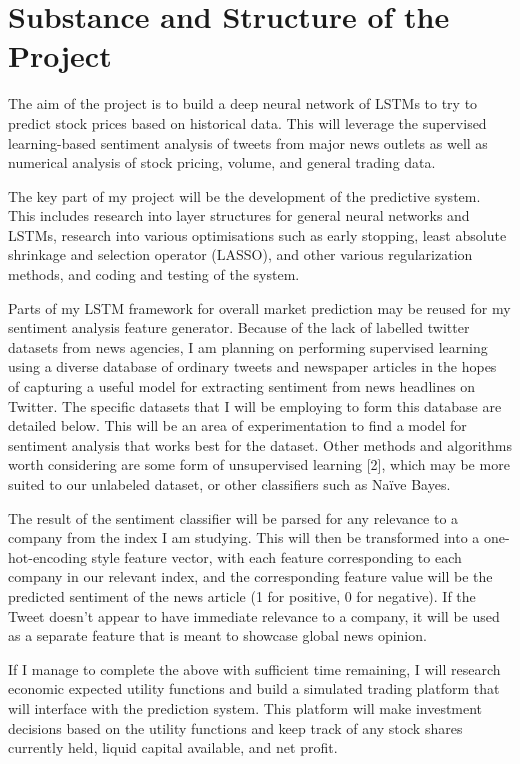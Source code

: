 \documentclass[12pt,a4paper,twoside,openright]{report}
\begin{document}
\section*{Substance and Structure of the Project}

The aim of the project is to build a deep neural network of LSTMs to try to predict stock prices
based on historical data. This will leverage the supervised learning-based sentiment analysis of
tweets from major news outlets as well as numerical analysis of stock pricing, volume, and
general trading data.

The key part of my project will be the development of the predictive system. This includes
research into layer structures for general neural networks and LSTMs, research into various
optimisations such as early stopping, least absolute shrinkage and selection operator (LASSO),
and other various regularization methods, and coding and testing of the system.

Parts of my LSTM framework for overall market prediction may be reused for my sentiment
analysis feature generator. Because of the lack of labelled twitter datasets from news agencies, I
am planning on performing supervised learning using a diverse database of ordinary tweets and
newspaper articles in the hopes of capturing a useful model for extracting sentiment from news
headlines on Twitter. The specific datasets that I will be employing to form this database are
detailed below. This will be an area of experimentation to find a model for sentiment analysis
that works best for the dataset. Other methods and algorithms worth considering are some form
of unsupervised learning [2], which may be more suited to our unlabeled dataset, or other
classifiers such as Naïve Bayes.

The result of the sentiment classifier will be parsed for any relevance to a company from the
index I am studying. This will then be transformed into a one-hot-encoding style feature vector,
with each feature corresponding to each company in our relevant index, and the corresponding
feature value will be the predicted sentiment of the news article (1 for positive, 0 for negative). If
the Tweet doesn’t appear to have immediate relevance to a company, it will be used as a separate
feature that is meant to showcase global news opinion.

If I manage to complete the above with sufficient time remaining, I will research economic
expected utility functions and build a simulated trading platform that will interface with the 
prediction system. This platform will make investment decisions based on the utility functions
and keep track of any stock shares currently held, liquid capital available, and net profit.
\end{document}
